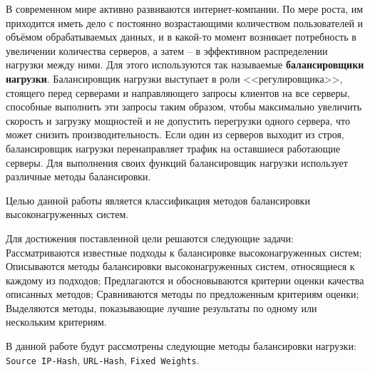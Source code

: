 

В современном мире активно развиваются интернет-компании. По мере роста, им
приходится иметь дело с постоянно возрастающими количеством пользователей и
объёмом обрабатываемых данных, и в какой-то момент возникает потребность в
увеличении количества серверов, а затем -- в эффективном распределении нагрузки
между ними. Для этого используются так называемые \textbf{балансировщики
нагрузки}. Балансировщик нагрузки выступает в роли <<регулировщика>>, стоящего
перед серверами и направляющего запросы клиентов на все серверы, способные
выполнить эти запросы таким образом, чтобы максимально увеличить скорость и
загрузку мощностей и не допустить перегрузки одного сервера, что может снизить
производительность. Если один из серверов выходит из строя, балансировщик
нагрузки перенаправляет трафик на оставшиеся работающие серверы. Для выполнения
своих функций балансировщик нагрузки использует различные методы балансировки.
\cite{nginxlb}


Целью данной работы является классификация методов балансировки
высоконагруженных систем.


Для достижения поставленной цели решаются следующие задачи:
    Рассматриваются известные подходы к балансировке высоконагруженных систем;
    Описываются методы балансировки высоконагруженных систем, относящиеся к каждому из подходов;
    Предлагаются и обосновываются критерии оценки качества описанных методов;
    Сравниваются методы по предложенным критериям оценки;
    Выделяются методы, показывающие лучшие результаты по одному или нескольким критериям.


В данной работе будут рассмотрены следующие методы балансировки нагрузки:
\texttt{Source IP-Hash}, \texttt{URL-Hash}, \texttt{Fixed Weights}.
